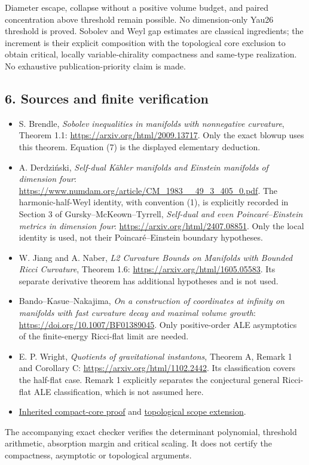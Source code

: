 \documentclass[
  11pt,
]{article}
\providecommand{\tightlist}{%
  \setlength{\itemsep}{0pt}\setlength{\parskip}{0pt}}
\begin{document}
Diameter escape, collapse without a positive volume budget, and paired
concentration above threshold remain possible. No dimension-only Yau26
threshold is proved. Sobolev and Weyl gap estimates are classical
ingredients; the increment is their explicit composition with the
topological core exclusion to obtain critical, locally
variable-chirality compactness and same-type realization. No exhaustive
publication-priority claim is made.

\hypertarget{sources-and-finite-verification}{%
\subsection{6. Sources and finite
verification}\label{sources-and-finite-verification}}

\begin{itemize}
\tightlist
\item
  S. Brendle, \emph{Sobolev inequalities in manifolds with nonnegative
  curvature}, Theorem 1.1: \url{https://arxiv.org/html/2009.13717}. Only
  the exact blowup uses this theorem. Equation (7) is the displayed
  elementary deduction.
\item
  A. Derdziński, \emph{Self-dual Kähler manifolds and Einstein manifolds
  of dimension four}:
  \url{https://www.numdam.org/article/CM_1983__49_3_405_0.pdf}. The
  harmonic-half-Weyl identity, with convention (1), is explicitly
  recorded in Section 3 of Gursky--McKeown--Tyrrell, \emph{Self-dual and
  even Poincaré--Einstein metrics in dimension four}:
  \url{https://arxiv.org/html/2407.08851}. Only the local identity is
  used, not their Poincaré--Einstein boundary hypotheses.
\item
  W. Jiang and A. Naber, \emph{L2 Curvature Bounds on Manifolds with
  Bounded Ricci Curvature}, Theorem 1.6:
  \url{https://arxiv.org/html/1605.05583}. Its separate derivative
  theorem has additional hypotheses and is not used.
\item
  Bando--Kasue--Nakajima, \emph{On a construction of coordinates at
  infinity on manifolds with fast curvature decay and maximal volume
  growth}: \url{https://doi.org/10.1007/BF01389045}. Only positive-order
  ALE asymptotics of the finite-energy Ricci-flat limit are needed.
\item
  E. P. Wright, \emph{Quotients of gravitational instantons}, Theorem A,
  Remark 1 and Corollary C: \url{https://arxiv.org/html/1102.2442}. Its
  classification covers the half-flat case. Remark 1 explicitly
  separates the conjectural general Ricci-flat ALE classification, which
  is not assumed here.
\item
  \href{../mathematics/current/line1_aspherical_no_bubbles.md}{Inherited
  compact-core proof} and
  \href{20260923_topological_core_scope.md}{topological scope
  extension}.
\end{itemize}

The accompanying exact checker verifies the determinant polynomial,
threshold arithmetic, absorption margin and critical scaling. It does
not certify the compactness, asymptotic or topological arguments.
\end{document}
